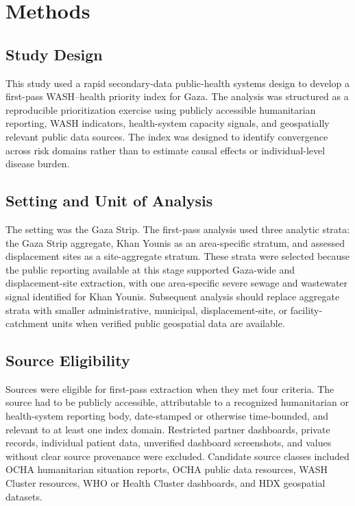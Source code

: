 \section{Methods}

\subsection{Study Design}

This study used a rapid secondary-data public-health systems design to develop a first-pass WASH--health priority index for Gaza. The analysis was structured as a reproducible prioritization exercise using publicly accessible humanitarian reporting, WASH indicators, health-system capacity signals, and geospatially relevant public data sources. The index was designed to identify convergence across risk domains rather than to estimate causal effects or individual-level disease burden.

\subsection{Setting and Unit of Analysis}

The setting was the Gaza Strip. The first-pass analysis used three analytic strata: the Gaza Strip aggregate, Khan Younis as an area-specific stratum, and assessed displacement sites as a site-aggregate stratum. These strata were selected because the public reporting available at this stage supported Gaza-wide and displacement-site extraction, with one area-specific severe sewage and wastewater signal identified for Khan Younis. Subsequent analysis should replace aggregate strata with smaller administrative, municipal, displacement-site, or facility-catchment units when verified public geospatial data are available.

\subsection{Source Eligibility}

Sources were eligible for first-pass extraction when they met four criteria. The source had to be publicly accessible, attributable to a recognized humanitarian or health-system reporting body, date-stamped or otherwise time-bounded, and relevant to at least one index domain. Restricted partner dashboards, private records, individual patient data, unverified dashboard screenshots, and values without clear source provenance were excluded. Candidate source classes included OCHA humanitarian situation reports, OCHA public data resources, WASH Cluster resources, WHO or Health Cluster dashboards, and HDX geospatial datasets.


